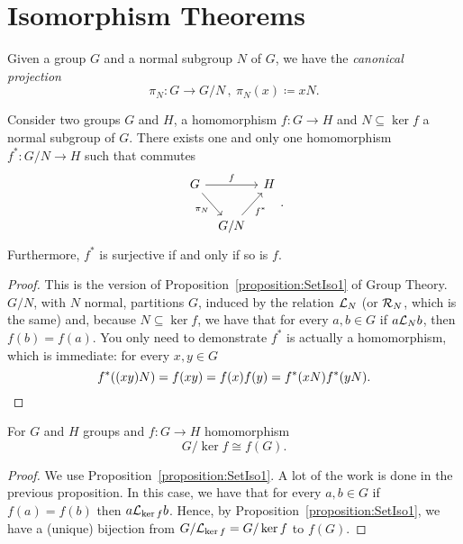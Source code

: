 
\section{Isomorphism Theorems}

Given a group \(G\) and a normal subgroup \(N\) of \(G\), we have the {\em canonical projection}
\[\pi_N : G \to G/N\,, \ \pi_N(x) \coloneq xN .\]

\begin{proposition}\label{proposition:GrpIso0}
Consider two groups \(G\) and \(H\), a homomorphism \(f : G \to H\) and \(N \subseteq \ker f\) a normal subgroup of \(G\). There exists one and only one homomorphism \(f^\ast : G/N \to H\) such that commutes
\[\begin{tikzcd}[column sep=tiny]
G \ar["f", rr] \ar["{\pi_N}", swap, dr] & & H \\
& G/N \ar["{f^\ast}", swap, ur]
\end{tikzcd}.\]
Furthermore, \(f^\ast\) is surjective if and only if so is \(f\).
\end{proposition}

\begin{proof}
This is the version of Proposition~\ref{proposition:SetIso1} of Group Theory. \(G/N\), with \(N\) normal, partitions \(G\), induced by the relation \(\mathcal L_N\) (or \(\mathcal R_N\), which is the same) and, because \(N \subseteq \ker f\), we have that for every \(a, b \in G\) if \(a \mathcal L_N b\), then \(f(b) = f(a)\).\newline
You only need to demonstrate \(f^\ast\) is actually a homomorphism, which is immediate: for every \(x, y \in G\)
\[f^\ast((xy)N) = f(xy) = f(x)f(y) = f^\ast(xN)f^\ast(yN) .\qedhere\]
\end{proof}

\begin{proposition}\label{proposition:GrpIso1}
For \(G\) and \(H\) groups and \(f : G \to H\) homomorphism
\[G/\ker f \cong f(G) .\]
\end{proposition}

\begin{proof}
We use Proposition~\ref{proposition:SetIso1}. A lot of the work is done in the previous proposition. In this case, we have that for every \(a, b \in G\) if \(f(a) = f(b)\) then \(a \mathcal L_{\ker f} b\). Hence, by Proposition~\ref{proposition:SetIso1}, we have a (unique) bijection from \(G/\mathcal L_{\ker f} = G/\ker f\) to \(f(G)\).
\end{proof}

